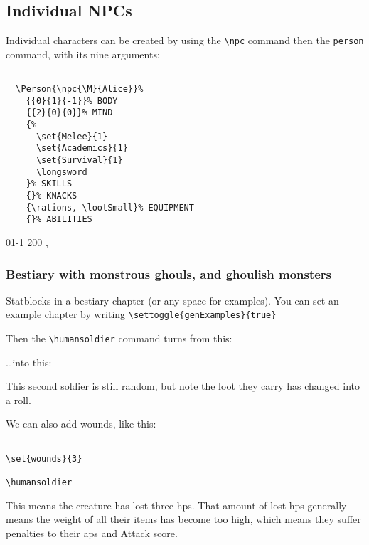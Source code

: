 \documentclass[a4paper,openany]{book}
\begin{document}
\begin{multicols}{2}

\subsection{Individual NPCs}

Individual characters can be created by using the \verb"\npc" command then the \verb"person" command, with its nine arguments:

\begin{verbatim}

  \Person{\npc{\M}{Alice}}%
    {{0}{1}{-1}}% BODY
    {{2}{0}{0}}% MIND
    {%
      \set{Melee}{1}
      \set{Academics}{1}
      \set{Survival}{1}
      \longsword
    }% SKILLS
    {}% KNACKS
    {\rations, \lootSmall}% EQUIPMENT
    {}% ABILITIES

\end{verbatim}

%
  {{0}{1}{-1}}%
  {{2}{0}{0}}%
  {%
    \shortsword
    \partiallisk
  }%
  {}%
  {\rations, \lootSmall}%
  {}%

\subsubsection{Bestiary with monstrous ghouls, and ghoulish monsters}

Statblocks in a bestiary chapter (or any space for examples).
You can set an example chapter by writing \verb"\settoggle{genExamples}{true}"

Then the \verb"\humansoldier" command turns from this:

\humansoldier

\ldots into this:


\humansoldier

This second soldier is still random, but note the loot they carry has changed into a roll.

We can also add wounds, like this:

\begin{verbatim}

\set{wounds}{3}

\humansoldier

\end{verbatim}

This means the creature has lost three \glspl{hp}.
That amount of lost \glspl{hp} generally means the \gls{weight} of all their items has become too high, which means they suffer penalties to their \glspl{ap} and Attack score.


\end{multicols}
\end{document}
